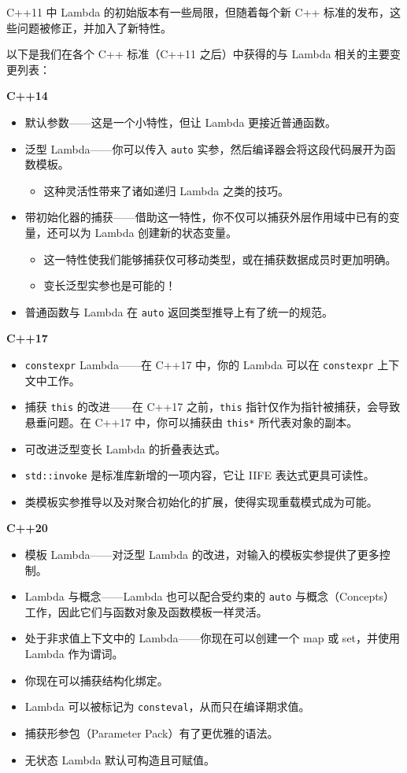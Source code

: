 C++11 中 Lambda 的初始版本有一些局限，但随着每个新 C++ 标准的发布，这些问题被修正，并加入了新特性。

以下是我们在各个 C++ 标准（C++11 之后）中获得的与 Lambda 相关的主要变更列表：

\textbf{C++14}

\begin{itemize}
\item 默认参数——这是一个小特性，但让 Lambda 更接近普通函数。
\item 泛型 Lambda——你可以传入 \texttt{auto} 实参，然后编译器会将这段代码展开为函数模板。
\begin{itemize}
\item 这种灵活性带来了诸如递归 Lambda 之类的技巧。
\end{itemize}
\item 带初始化器的捕获——借助这一特性，你不仅可以捕获外层作用域中已有的变量，还可以为 Lambda 创建新的状态变量。
\begin{itemize}
\item 这一特性使我们能够捕获仅可移动类型，或在捕获数据成员时更加明确。
\item 变长泛型实参也是可能的！
\end{itemize}
\item 普通函数与 Lambda 在 \texttt{auto} 返回类型推导上有了统一的规范。
\end{itemize}

\textbf{C++17}

\begin{itemize}
\item \texttt{constexpr} Lambda——在 C++17 中，你的 Lambda 可以在 \texttt{constexpr} 上下文中工作。
\item 捕获 \texttt{this} 的改进——在 C++17 之前，\texttt{this} 指针仅作为指针被捕获，会导致悬垂问题。在 C++17 中，你可以捕获由 \texttt{this*} 所代表对象的副本。
\item 可改进泛型变长 Lambda 的折叠表达式。
\item \texttt{std::invoke} 是标准库新增的一项内容，它让 IIFE 表达式更具可读性。
\item 类模板实参推导以及对聚合初始化的扩展，使得实现重载模式成为可能。
\end{itemize}

\textbf{C++20}

\begin{itemize}
\item 模板 Lambda——对泛型 Lambda 的改进，对输入的模板实参提供了更多控制。
\item Lambda 与概念——Lambda 也可以配合受约束的 \texttt{auto} 与概念（Concepts）工作，因此它们与函数对象及函数模板一样灵活。
\item 处于非求值上下文中的 Lambda——你现在可以创建一个 map 或 set，并使用 Lambda 作为谓词。
\item 你现在可以捕获结构化绑定。
\item Lambda 可以被标记为 \texttt{consteval}，从而只在编译期求值。
\item 捕获形参包（Parameter Pack）有了更优雅的语法。
\item 无状态 Lambda 默认可构造且可赋值。
\end{itemize}
